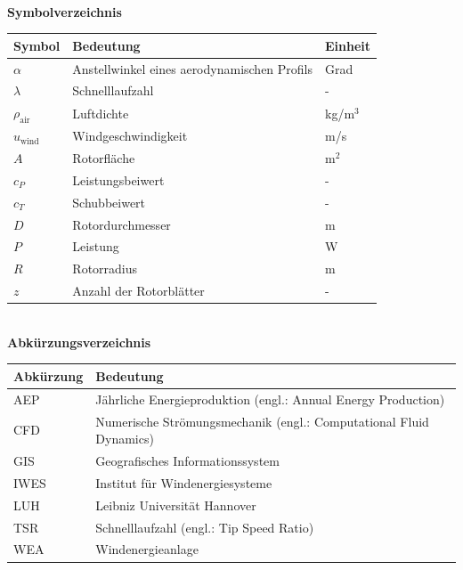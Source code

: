 
~\\[1.5cm]
{\huge\textbf{Symbolverzeichnis}}
\vspace{1.5cm}

\begin{tabularx}{0.9\textwidth}{l X l}
	\textbf{Symbol} & \textbf{Bedeutung} & \textbf{Einheit} \\
	\hline
	$\alpha$                & Anstellwinkel eines aerodynamischen Profils       & Grad     \\
	$\lambda$              & Schnelllaufzahl          & -        \\
	$\rho_{\text{air}}$    & Luftdichte                                    & kg/m$^3$ \\
	$u_{\text{wind}}$      & Windgeschwindigkeit                           & m/s      \\
	$A$                    & Rotorfläche              & m$^2$    \\
	$c_P$                  & Leistungsbeiwert                         & -        \\
	$c_T$                  & Schubbeiwert                            & -        \\
	$D$                    & Rotordurchmesser                            & m \\
	$P$                    & Leistung        & W        \\
	$R$                    & Rotorradius                                 & m        \\
	$z$                    & Anzahl der Rotorblätter                          & -        \\
\end{tabularx}

\clearpage


~\\[1.5cm]
{\huge\textbf{Abkürzungsverzeichnis}}
\vspace{1.5cm}

\begin{tabularx}{0.9\textwidth}{l X}
	\textbf{Abkürzung} & \textbf{Bedeutung} \\
	\hline
	AEP & Jährliche Energieproduktion (engl.: Annual Energy Production) \\
	CFD & Numerische Strömungsmechanik (engl.: Computational Fluid Dynamics) \\
	GIS & Geografisches Informationssystem \\
	IWES & Institut für Windenergiesysteme \\
	LUH & Leibniz Universität Hannover \\
	TSR & Schnelllaufzahl (engl.: Tip Speed Ratio) \\
	WEA & Windenergieanlage \\
\end{tabularx}

\clearpage
